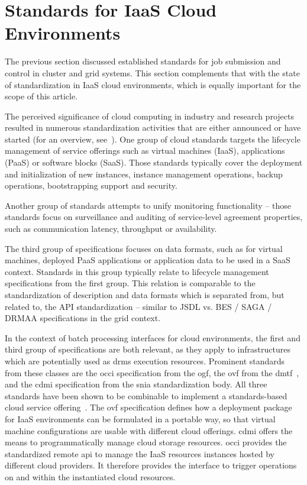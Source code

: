 \documentclass[twocolumn]{svjour3}       %
\begin{document}
\section{Standards for IaaS Cloud Environments}
\label{sec:speciaas}

The previous section discussed established standards for job submission and control in cluster and grid systems.  This section complements that with the state of standardization in IaaS cloud environments, which is equally important for the scope of this article.  

The perceived significance of cloud computing in industry and research projects resulted in numerous standardization activities that are either announced or have started (for an overview, see~\cite{cloud_standards}).  One group of cloud standards targets the lifecycle management of service offerings such as virtual machines (IaaS), applications (PaaS) or software blocks (SaaS). Those standards typically cover the deployment and initialization of new instances, instance management operations, backup operations, bootstrapping support and security.



Another group of standards attempts to unify monitoring functionality -- those standards focus on surveillance and auditing of service-level agreement properties, such as communication latency, throughput or availability.

The third group of specifications focuses on data formats, such as for virtual machines, deployed PaaS applications or application data to be used in a SaaS context. Standards in this group typically relate to lifecycle management specifications from the first group. This relation is comparable to the standardization of description and data formats which is separated from, but related to, the API standardization -- similar to JSDL vs. BES / SAGA / DRMAA specifications in the grid context. 

In the context of batch processing interfaces for cloud environments, the first and third group of specifications are both relevant, as they apply to infrastructures which are potentially used as \gls{drms} execution resources. Prominent standards from these classes are the \gls{occi} specification from the \gls{ogf}, the \gls{ovf} from the \gls{dmtf}~\cite{citemaster_9644}, and the \gls{cdmi} specification from the \gls{snia} standardization body. All three standards have been shown to be combinable to implement a standards-based cloud service offering~\cite{citemaster_9645}. The \gls{ovf} specification defines how a deployment package for IaaS environments can be formulated in a portable way, so that virtual machine configurations are usable with different cloud offerings. \gls{cdmi} offers the means to programmatically manage cloud storage resources. \gls{occi} provides the standardized remote \gls{api} to manage the IaaS resources instances hosted by different cloud providers. It therefore provides the interface to trigger operations on and within the instantiated cloud resources. 
\end{document}
